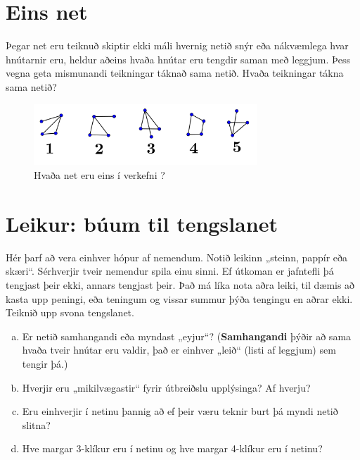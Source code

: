 \documentclass[b5paper,12pt]{book}
\renewcommand*\thesection{\arabic{section}}
\begin{document}
\section{Eins net}
Þegar net eru teiknuð skiptir ekki máli hvernig netið snýr eða nákvæmlega hvar hnútarnir eru, heldur aðeins hvaða hnútar eru tengdir saman með leggjum. Þess vegna geta mismunandi teikningar táknað sama netið. Hvaða teikningar tákna sama netið?
\begin{figure}[h]
  \includegraphics[width=0.75\textwidth, center]{Myndir/einsnet.png}
  \caption*{Hvaða net eru eins í verkefni \thesection{}?}
\end{figure}

\section{Leikur: búum til tengslanet}
Hér þarf að vera einhver hópur af nemendum. Notið leikinn „steinn, pappír eða skæri“. Sérhverjir tveir nemendur spila einu sinni. Ef útkoman er jafntefli þá tengjast þeir ekki, annars tengjast þeir. Það má líka nota aðra leiki, til dæmis að kasta upp peningi, eða teningum og vissar summur þýða tengingu en aðrar ekki. Teiknið upp svona tengslanet.  
\begin{enumerate}[(a)]
    \item Er netið samhangandi eða myndast „eyjur“? (\textbf{Samhangandi} þýðir að sama hvaða tveir hnútar eru valdir, það er einhver „leið“ (listi af leggjum) sem tengir þá.)  
    \item Hverjir eru „mikilvægastir“ fyrir útbreiðslu upplýsinga? Af hverju?
    \item Eru einhverjir í netinu þannig að ef þeir væru teknir burt þá myndi netið slitna?
    \item Hve margar 3-klíkur eru í netinu og hve margar 4-klíkur eru í netinu?
\end{enumerate}
\end{document}
